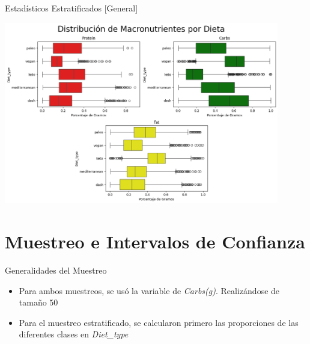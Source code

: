 \documentclass{beamer}
\begin{document}
    \begin{frame}{Estadísticos Estratificados [General]}
        \begin{center}
            \includegraphics[width=0.9\textwidth]{Resources/2_03_plot_06.png}
        \end{center}
    \end{frame}

    \section{Muestreo e Intervalos de Confianza}

    \begin{frame}{Generalidades del Muestreo}
        \begin{itemize}
            \item Para ambos muestreos, se usó la 
            variable de \emph{Carbs(g)}. Realizándose 
            de tamaño $50$
            \item Para el muestreo estratificado, 
            se calcularon primero las proporciones 
            de las diferentes clases en \emph{Diet\_type}
        \end{itemize}
    \end{frame}
\end{document}
